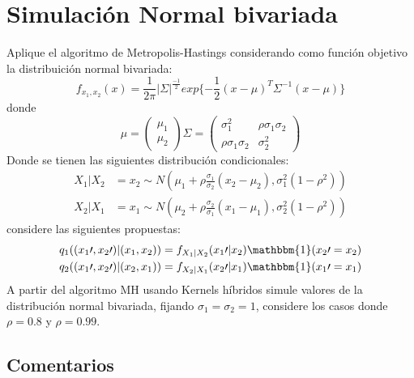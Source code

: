 \documentclass[preprint,12pt]{elsarticle}
\begin{document}
\section{Simulación Normal bivariada}
Aplique el algoritmo de Metropolis-Hastings considerando como función objetivo la distribuición normal bivariada:
\begin{equation}
    f_{x_1, x_2}(x) = \frac{1}{2 \pi} | \Sigma |^{\frac{-1}{2}} exp \{ -\frac{1}{2} (x-\mu)^T \Sigma^{-1} (x-\mu) \}
\end{equation}
donde 
\begin{equation}
    \mu = \begin{pmatrix} \mu_1 \\ \mu_2 \end{pmatrix}
    \Sigma = \begin{pmatrix} \sigma_1^2 & \rho \sigma_1 \sigma_2 \\ \rho \sigma_1 \sigma_2 & \sigma_2^2 \end{pmatrix}
\end{equation}
Donde se tienen las siguientes distribución condicionales:
\begin{equation}
    \begin{split}
        X_1 | X_2 &= x_2 \sim N \left (\mu_1 + \rho \frac{\sigma_1}{\sigma_2} (x_2 - \mu_2), \sigma_1^2 (1-\rho^2)  \right ) \\
        X_2 | X_1 &= x_1 \sim N \left (\mu_2 + \rho \frac{\sigma_2}{\sigma_1} (x_1 - \mu_1), \sigma_2^2 (1-\rho^2)  \right )
    \end{split}
\end{equation}
considere las siguientes propuestas:
\begin{equation}
    \begin{split}
        q_1 (( x_1 \prime , x_2 \prime) | (x_1, x_2)) = f_{X_1 | X_2} (x_1 \prime | x_2 ) \mathbbm{1}(x_2 \prime = x_2) \\
        q_2 (( x_1 \prime , x_2 \prime) | (x_2, x_1)) = f_{X_2 | X_1} (x_2 \prime | x_1 ) \mathbbm{1}(x_1 \prime = x_1)
    \end{split}
\end{equation}
A partir del algoritmo MH usando Kernels híbridos simule valores de la distribución normal bivariada, fijando $\sigma_1 = \sigma_2 = 1$, considere los casos donde $\rho = 0.8$ y $\rho=0.99$.

\subsection*{Comentarios}
\end{document}
